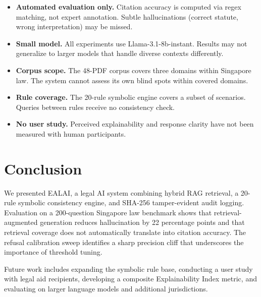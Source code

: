 \documentclass[runningheads]{llncs}
\let\oldsection\section
\renewcommand{\section}{\clearpage\oldsection}
\begin{document}
\begin{itemize}
  \item \textbf{Automated evaluation only.} Citation accuracy is computed via regex
        matching, not expert annotation. Subtle hallucinations (correct statute, wrong
        interpretation) may be missed.
  \item \textbf{Small model.} All experiments use Llama-3.1-8b-instant. Results may
        not generalize to larger models that handle diverse contexts differently.
  \item \textbf{Corpus scope.} The 48-PDF corpus covers three domains within
        Singapore law. The system cannot assess its own blind spots within covered
        domains.
  \item \textbf{Rule coverage.} The 20-rule symbolic engine covers a subset of
        scenarios. Queries between rules receive no consistency check.
  \item \textbf{No user study.} Perceived explainability and response clarity have not
        been measured with human participants.
\end{itemize}

\section{Conclusion}

We presented EALAI, a legal AI system combining hybrid RAG retrieval, a 20-rule
symbolic consistency engine, and SHA-256 tamper-evident audit logging. Evaluation on a
200-question Singapore law benchmark shows that retrieval-augmented generation reduces
hallucination by 22 percentage points and that retrieval coverage does not
automatically translate into citation accuracy. The refusal calibration sweep
identifies a sharp precision cliff that underscores the importance of threshold
tuning.

Future work includes expanding the symbolic rule base, conducting a user study with
legal aid recipients, developing a composite Explainability Index metric, and
evaluating on larger language models and additional jurisdictions.
\end{document}
